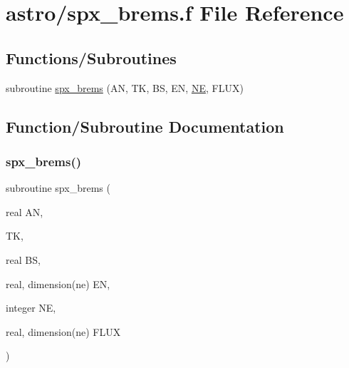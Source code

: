 \hypertarget{spx__brems_8f}{}\section{astro/spx\+\_\+brems.f File Reference}
\label{spx__brems_8f}
\subsection*{Functions/\+Subroutines}
\begin{DoxyCompactItemize}
\item 
subroutine \hyperlink{spx__brems_8f_afae79d3af5a0a38777c45ab1ae55f73a}{spx\+\_\+brems} (AN, TK, BS, EN, \hyperlink{eval__tab_8h_a5af9139e882aef6c820ae908589a40d6}{NE}, F\+L\+UX)
\end{DoxyCompactItemize}


\subsection{Function/\+Subroutine Documentation}
\mbox{\label{spx__brems_8f_afae79d3af5a0a38777c45ab1ae55f73a}} 
\subsubsection{\texorpdfstring{spx\+\_\+brems()}{spx\_brems()}}
{\footnotesize\ttfamily subroutine spx\+\_\+brems (\begin{DoxyParamCaption}\item[{real}]{AN,  }\item[{}]{TK,  }\item[{real}]{BS,  }\item[{real, dimension(ne)}]{EN,  }\item[{integer}]{NE,  }\item[{real, dimension(ne)}]{F\+L\+UX }\end{DoxyParamCaption})}

